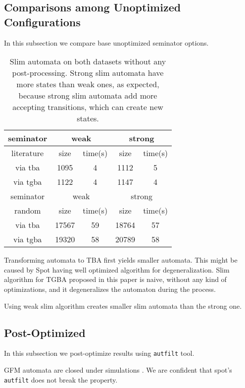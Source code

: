 \documentclass[
	digital,
nolof, nolot
]{fithesis3}
\begin{document}
	\subsection{Comparisons among Unoptimized Configurations}
	In this subsection we compare base unoptimized seminator options.
\begin{table}[ht]
	\centering
	\caption{Slim automata on both datasets without any post-processing. Strong slim automata have more states than weak ones, as expected, because strong slim automata add more accepting transitions, which can create new states. }
		\begin{tabular}{ |c||c|c|c|c| } 
			\hline
			seminator&\multicolumn{2}{c|}{weak}&\multicolumn{2}{c|}{strong} \\
			\hline
			literature&size&time(s)&size&time(s)\\
			\hhline{|=====|}
			
			via tba	&	1095	&4	& 1112 	&5\\
			\hline
			via tgba&	1122	&4		&1147	&4\\ 
			\hline
			\hline
			\hline
			seminator&\multicolumn{2}{c|}{weak}&\multicolumn{2}{c|}{strong} \\
			\hhline{|=====|}
			random&size&time(s)&size&time(s)\\
			\hline
			via tba&17567&	59& 18764 &57\\
			\hline
			via tgba&19320&	58& 20789&58\\ 
			\hline
		\end{tabular}
\end{table}
	
	

	
	
	Transforming automata to TBA first yields smaller automata. This might be caused by Spot having well optimized algorithm for degeneralization. Slim algorithm for TGBA proposed in this paper is naive, without any kind of optimizations, and it degeneralizes the automaton during the process.
	
	Using weak slim algorithm creates smaller slim automata than the strong one. 

	\subsection{Post-Optimized}
	In this subsection we post-optimize results using \texttt{autfilt} tool.
	
	GFM automata are closed under simulations \cite[Section~3.1]{hlavni}. We are confident that spot's \texttt{autfilt} does not break the property.
	
\end{document}
